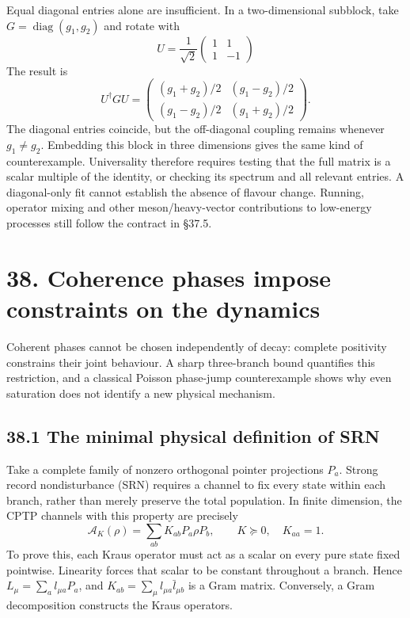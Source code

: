 \documentclass[
  11pt,
  oneside]{book}
\begin{document}
Equal diagonal entries alone are insufficient. In a two-dimensional
subblock, take \(G=\operatorname{diag}(g_1,g_2)\) and rotate with \[
U=\frac1{\sqrt2}\begin{pmatrix}1&1\\1&-1\end{pmatrix}
\] The result is \[
U^\dagger GU=
\begin{pmatrix}
(g_1+g_2)/2&(g_1-g_2)/2\\
(g_1-g_2)/2&(g_1+g_2)/2
\end{pmatrix}.
\] The diagonal entries coincide, but the off-diagonal coupling remains
whenever \(g_1\ne g_2\). Embedding this block in three dimensions gives
the same kind of counterexample. Universality therefore requires testing
that the full matrix is a scalar multiple of the identity, or checking
its spectrum and all relevant entries. A diagonal-only fit cannot
establish the absence of flavour change. Running, operator mixing and
other meson/heavy-vector contributions to low-energy processes still
follow the contract in §37.5.

\chapter{38. Coherence phases impose constraints on the
dynamics}\label{ch-38}

Coherent phases cannot be chosen independently of decay: complete
positivity constrains their joint behaviour. A sharp three-branch bound
quantifies this restriction, and a classical Poisson phase-jump
counterexample shows why even saturation does not identify a new
physical mechanism.

\section{38.1 The minimal physical definition of SRN}

Take a complete family of nonzero orthogonal pointer projections
\(P_a\). Strong record nondisturbance (SRN) requires a channel to fix
every state within each branch, rather than merely preserve the total
population. In finite dimension, the CPTP channels with this property
are precisely \[
\mathcal A_K(\rho)=\sum_{ab}K_{ab}P_a\rho P_b,\qquad
K\succeq0,\quad K_{aa}=1.
\tag{38.1}
\] To prove this, each Kraus operator must act as a scalar on every pure
state fixed pointwise. Linearity forces that scalar to be constant
throughout a branch. Hence \(L_\mu=\sum_a l_{\mu a}P_a\), and
\(K_{ab}=\sum_\mu l_{\mu a}\bar l_{\mu b}\) is a Gram matrix.
Conversely, a Gram decomposition constructs the Kraus operators.
\end{document}
